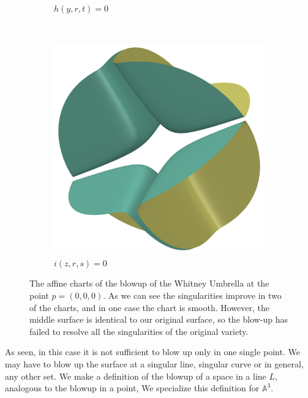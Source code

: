 \documentclass{article}
\newcommand{\A}{\ensuremath{\mathbb{A}}}
\begin{document}
\begin{example}
\begin{figure}[h]
\begin{subfigure}[t]{0.3\textwidth}
                \caption{$h(y, r, t) = 0$}
                \label{fig:whitney_blowup}
            \end{subfigure}      
            ~
            \begin{subfigure}[t]{0.3\textwidth}
                \includegraphics[width=\textwidth]{pictures/blowup_line_3.png}
                \caption{$i(z, r, s) = 0$}
            \end{subfigure}      
        \caption{The affine charts of the blowup of the Whitney Umbrella at the
            point $p = (0, 0, 0)$. As we can see the singularities improve in
            two of the charts, and in one case the chart is smooth. However,
            the middle surface is identical to our original surface, so the
            blow-up has failed to resolve all the singularities of the original
            variety.}
            \label{fig:blowup_line_charts}
        \end{figure}      
    \end{example} 
   
    As seen, in this case it is not sufficient to blow up only in one single
    point. We may have to blow up the surface at a singular line, singular
    curve or in general, any other set. We make a definition of the blowup of a
    space in a line $L$, analogous to the blowup in a point,  We specialize
    this definition for $\A^3$.
\end{document}
